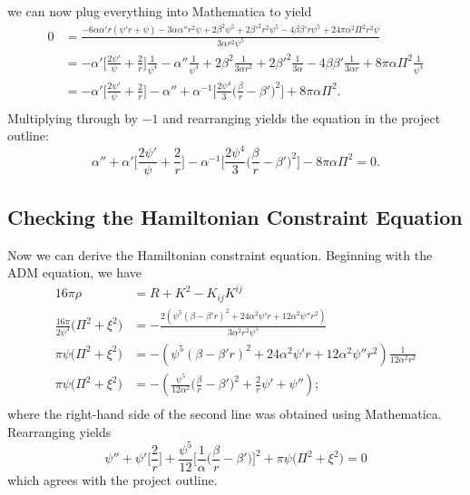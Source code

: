 \documentclass[12pt]{article}
\numberwithin{equation}{section}
\begin{document}
we can now plug everything into Mathematica to yield
\begin{equation}
\begin{aligned}
0 &= \frac{-6 \alpha \alpha' r (\psi' r + \psi ) - 3 \alpha \alpha'' r^2 \psi + 2 \beta^2 \psi^5 + 2 \beta'^2 r^2 \psi ^5-4 \beta \beta' r \psi^5 + 24 \pi  \alpha^2 \Pi^2 r^2 \psi }{3 \alpha  r^2 \psi^5} \\
&= - \alpha' \Big[ \frac{2 \psi'}{\psi} + \frac{2}{r} \Big] \frac{1}{\psi^4} - \alpha'' \frac{1}{\psi^4} + 2 \beta^2 \frac{1}{3 \alpha r^2} + 2 \beta'^2 \frac{1}{3 \alpha} - 4 \beta \beta' \frac{1}{3 \alpha r} + 8 \pi \alpha \Pi^2 \frac{1}{\psi^4} \\
&= - \alpha' \Big[ \frac{2 \psi'}{\psi} + \frac{2}{r} \Big] - \alpha'' + \alpha^{-1} \Big[ \frac{2 \psi^4}{3} \Big( \frac{\beta}{r} - \beta' \Big)^2 \Big] + 8 \pi \alpha \Pi^2. \\
\end{aligned}
\end{equation}
Multiplying through by $-1$ and rearranging yields the equation in the project outline:
\begin{equation}
\boxed{ \alpha'' + \alpha' \Big[ \frac{2 \psi'}{\psi} + \frac{2}{r} \Big] - \alpha^{-1} \Big[ \frac{2 \psi^4}{3} \Big( \frac{\beta}{r} - \beta' \Big)^2 \Big] - 8 \pi \alpha \Pi^2 = 0}.
\end{equation}

\subsection{Checking the Hamiltonian Constraint Equation}
Now we can derive the Hamiltonian constraint equation.  Beginning with the ADM equation, we have
\begin{equation}
\begin{aligned}
16 \pi \rho &= R + K^2 - K_{ij} K^{ij}\\
\frac{16 \pi}{2 \psi^{4}} \Big( \Pi^2 + \xi^2 \Big) &= -\frac{2 \left( \psi^5 (\beta - \beta' r)^2 + 24 \alpha^2 \psi' r + 12 \alpha^2 \psi'' r^2 \right)}{3 \alpha^2 r^2 \psi^5} \\
\pi \psi \Big( \Pi^2 + \xi^2 \Big) &= -\left( \psi^5 (\beta - \beta' r)^2 + 24 \alpha^2 \psi' r + 12 \alpha^2 \psi'' r^2 \right) \frac{1}{12 \alpha^2 r^2} \\
\pi \psi \Big( \Pi^2 + \xi^2 \Big) &= -\left( \frac{\psi^5}{12 \alpha^2} \Big( \frac{\beta}{r} - \beta' \Big)^2 + \frac{2}{r} \psi' + \psi'' \right); \\
\end{aligned}
\end{equation}
where the right-hand side of the second line was obtained using Mathematica.  Rearranging yields
\begin{equation}
\boxed{ \psi'' + \psi' \Big[ \frac{2}{r} \Big] + \frac{\psi^5}{12} \Big[ \frac{1}{\alpha} \Big( \frac{\beta}{r} - \beta' \Big) \Big]^2 + \pi \psi \Big( \Pi^2 + \xi^2 \Big) = 0 }
\end{equation}
which agrees with the project outline.
\end{document}
